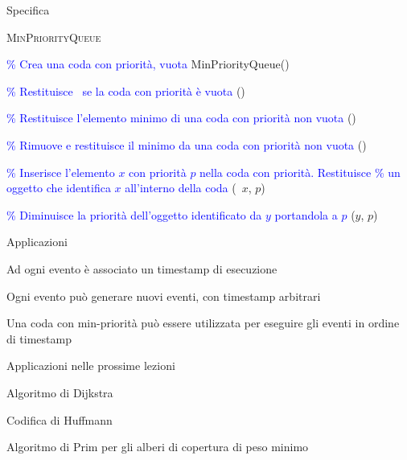 \begin{frame}[shrink=8]{Specifica}

\vspace{-12pt}
\begin{Procedure}
\caption[A]{\textsc{MinPriorityQueue}}

\BlankLine
\textcolor{blue}{\% Crea una coda con priorità, vuota}\;
\textsf{MinPriorityQueue}()\;

\BlankLine
\textcolor{blue}{\% Restituisce \TRUE\ se la coda con priorità è vuota}\;
\BOOLEAN \setempty()\; 

\BlankLine
\textcolor{blue}{\% Restituisce l'elemento minimo di una coda con priorità non vuota}\;
\Item \heapmin()\;

\BlankLine
\textcolor{blue}{\% Rimuove e restituisce il minimo da una coda con priorità non vuota}\;
\Item \heapdeletemin()\;
 
\BlankLine
\textcolor{blue}{\% Inserisce l'elemento $x$ con priorità $p$ nella coda con priorità. Restituisce}\;
\textcolor{blue}{\% un oggetto \PriorityItem che identifica $x$ all'interno della coda}\;
\PriorityItem \heapinsert(\Item\ $x$, \INTEGER $p$)\;

\BlankLine
\textcolor{blue}{\% Diminuisce la priorità dell'oggetto identificato da $y$ portandola a $p$}\;
\heapdecrease(\PriorityItem $y$, \INTEGER $p$)\;

\BlankLine
\end{Procedure}

\end{frame}

\begin{frame}{Applicazioni}

\vspace{-9pt}
\BIL
\item Ad ogni evento è associato un timestamp di esecuzione
\item Ogni evento può generare nuovi eventi, con timestamp arbitrari
\item Una coda con min-priorità può essere utilizzata per eseguire gli eventi in ordine di timestamp
\EIL




\end{frame}

\begin{frame}{Applicazioni nelle prossime lezioni}
\BIL
\item Algoritmo di Dijkstra
\item Codifica di Huffmann
\item Algoritmo di Prim per gli alberi di copertura di peso minimo
\EIL
\end{frame}



